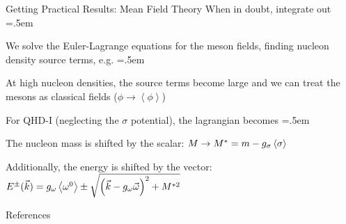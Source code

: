 \documentclass[xcolor={dvipsnames}]{beamer}
\let\olditemize=\itemize
\let\endolditemize=\enditemize
\renewenvironment{itemize}{\olditemize \itemsep=.5em }{\endolditemize}
\begin{document}
\begin{frame}{Getting Practical Results: Mean Field Theory}
\alert{When in doubt, integrate out}
\begin{itemize}
    \item<2-> We solve the Euler-Lagrange equations for the meson fields, finding nucleon density source terms, e.g.
\end{itemize}
\vspace{-1.25em}
\begin{itemize}
    \item<4-> At high nucleon densities, the source terms become large and we can treat the mesons as classical fields ($\phi \to \left<\phi\right>$)
    \item<5-> For QHD-I (neglecting the $\sigma$ potential), the lagrangian becomes \cite{Serot1992}
\end{itemize}
\vspace{-1.25em}
\begin{itemize}
    \item<7-> The nucleon mass is shifted by the scalar: $M \to M^* = m - g_\sigma\ev{\sigma}$
    \item<8-> Additionally, the energy is shifted by the vector: $E^\pm(\vec{k}) = g_\omega\ev{\omega^0} \pm \sqrt{\left(\vec{k} - g_\omega\vec{\omega}\right)^2 + M^{*2}}$
\end{itemize}
\end{frame}

\begin{frame}{References}
    
    
\end{frame}
\end{document}

